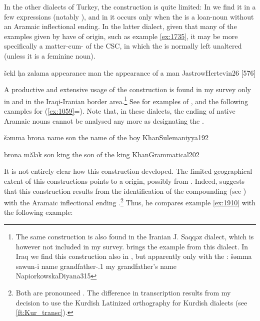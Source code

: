In the other  dialects of Turkey, the construction is quite limited: In \Cal we find it in a few expressions (notably ), and in \Her it occurs only when the \prim is a loan-noun without an Aramaic inflectional ending. In the latter dialect, given that many of the \Her examples given by \citet[26]{JastrowHertevin} have \prims of  origin, such as example \ref{ex:1735}, it may be more specifically a matter-cum- of the  CSC, in which the \prim is normally left unaltered (unless it is a feminine noun).

{šekl ḥa zalama}
{appearance \indef{} man}
{the appearance of a man}
{JastrowHertevin}{26 {[576]}}

\largerpage
A productive and extensive usage of the  construction is found in my survey only in \JSul and \JSan in the Iraqi-Iranian border area.\footnote{The same construction is also found in the Iranian J. Saqqəz dialect, which is however not included in my survey.  \citet[11]{GoldenbergInnovative} brings the example  from this dialect.  
In Iraq we find this construction also in \Diy, but apparently  only with the \prim {}: 
{šəmma sawun-i}
{name grandfather-\poss.1\sg{}}
{my grandfather's name}
{NapiorkowskaDiyana}{315}\antipar
}  See  for examples of \JSan, and the following examples for \JSul (\ref{ex:1059}=). Note that, in these dialects, the  ending of native Aramaic nouns cannot be analysed any more as designating the \free*.

{šəmma brona}
{name son}
{the name of the boy}
{KhanSulemaniyya}{192}\antipar 

\newpage 

{brona mălək}
{son king}
{the son of the king}
{KhanGrammatical}{202}

It is not entirely clear how this construction developed. The limited geographical extent of this constructions points to a  origin, possibly from \Sor. Indeed, \citet[202]{KhanGrammatical} suggests that this construction results from the identification of the compounding \ez* {} (see ) with the Aramaic inflectional ending .\footnote{Both are pronounced \phonetic[æ]. The difference in transcription results from my decision to use the Kurdish Latinized orthography for Kurdish dialects (see \vref{ft:Kur_transc}).}
Thus, he compares example \ref{ex:1910} with the following \KSul example:

